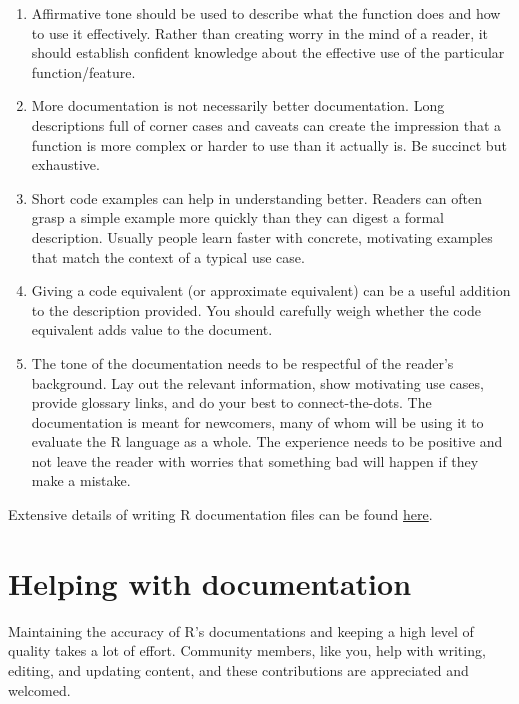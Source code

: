 \documentclass[
]{book}
\begin{document}
\begin{enumerate}
\def\labelenumi{\arabic{enumi}.}
\item
  Affirmative tone should be used to describe what the function does and how to use it effectively. Rather than creating worry in the mind of a reader, it should establish confident knowledge about the effective use of the particular function/feature.
\item
  More documentation is not necessarily better documentation. Long descriptions full of corner cases and caveats can create the impression that a function is more complex or harder to use than it actually is. Be succinct but exhaustive.
\item
  Short code examples can help in understanding better. Readers can often grasp a simple example more quickly than they can digest a formal description. Usually people learn faster with concrete, motivating examples that match the context of a typical use case.
\item
  Giving a code equivalent (or approximate equivalent) can be a useful addition to the description provided. You should carefully weigh whether the code equivalent adds value to the document.
\item
  The tone of the documentation needs to be respectful of the reader's background. Lay out the relevant information, show motivating use cases, provide glossary links, and do your best to connect-the-dots. The documentation is meant for newcomers, many of whom will be using it to evaluate the R language as a whole. The experience needs to be positive and not leave the reader with worries that something bad will happen if they make a mistake.
\end{enumerate}

Extensive details of writing R documentation files can be found \href{https://cran.r-project.org/doc/manuals/r-release/R-exts.html\#Writing-R-documentation-files}{here}.

\hypertarget{helping-with-documentation}{%
\section{Helping with documentation}\label{helping-with-documentation}}

Maintaining the accuracy of R's documentations and keeping a high level of quality takes a lot of effort. Community members, like you, help with writing, editing, and updating content, and these contributions are appreciated and welcomed.
\end{document}
